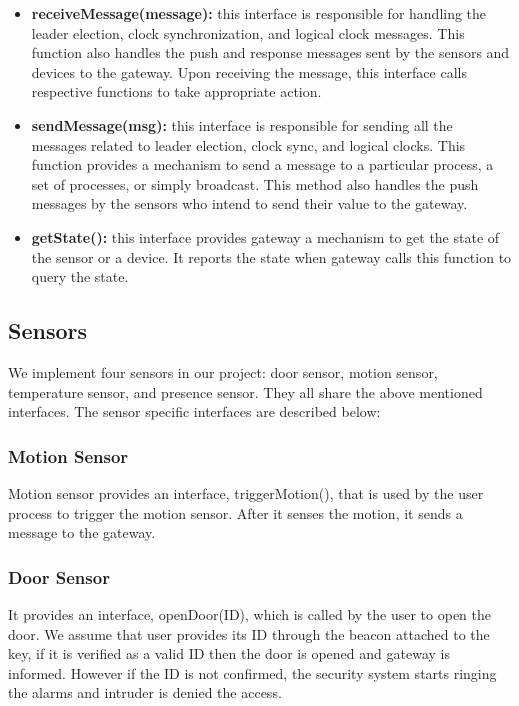 \documentclass[12pt]{article}
\begin{document}
\begin{itemize}
	\item \textbf{receiveMessage(message):} this interface is responsible for 
	handling the leader election, clock synchronization, and logical clock messages. 
	This function also handles the push and response messages sent by the sensors 
	and devices to the gateway.	Upon receiving the message, this interface calls respective functions to take 
	appropriate action.
	
	\item \textbf{sendMessage(msg):} this interface is responsible for sending all
	the messages related to leader election, clock sync, and logical clocks. 
	This function provides a mechanism to send a message  
	to a particular process, a set of processes, or simply broadcast. 
	This method also handles the push messages by the sensors who intend to send 
	their value to the gateway. 
	
	\item \textbf{getState():} this interface provides gateway a mechanism to get the 
	state of the sensor or a device. It reports the state when gateway calls this function
	to query the state. 
\end{itemize}



\subsection{Sensors}
We implement four sensors in our project: door sensor, motion sensor, 
temperature sensor, and presence sensor. They all share the above mentioned 
interfaces. The sensor specific interfaces are described below:

\subsubsection{Motion Sensor}
Motion sensor provides an interface, triggerMotion(), that is used by the user process
to trigger the motion sensor. After it senses the motion, it sends a message to the gateway. 

\subsubsection{Door Sensor}

It provides an interface, openDoor(ID), which is called by the user to open the door. 
We assume that user provides its ID through the beacon attached to the key, if 
it is verified as a valid ID then the door is opened and gateway is informed. 
However if the ID is not confirmed, the security system starts ringing the alarms 
and intruder is denied the access. 
\end{document}
